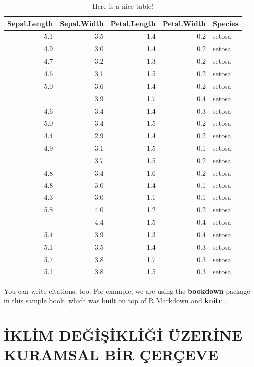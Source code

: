 \documentclass[
]{book}
\begin{document}
\begin{table}

\caption{\label{tab:nice-tab}Here is a nice table!}
\centering
\begin{tabular}[t]{rrrrl}
\toprule
Sepal.Length & Sepal.Width & Petal.Length & Petal.Width & Species\\
\midrule
5.1 & 3.5 & 1.4 & 0.2 & setosa\\
4.9 & 3.0 & 1.4 & 0.2 & setosa\\
4.7 & 3.2 & 1.3 & 0.2 & setosa\\
4.6 & 3.1 & 1.5 & 0.2 & setosa\\
5.0 & 3.6 & 1.4 & 0.2 & setosa\\
\addlinespace
5.4 & 3.9 & 1.7 & 0.4 & setosa\\
4.6 & 3.4 & 1.4 & 0.3 & setosa\\
5.0 & 3.4 & 1.5 & 0.2 & setosa\\
4.4 & 2.9 & 1.4 & 0.2 & setosa\\
4.9 & 3.1 & 1.5 & 0.1 & setosa\\
\addlinespace
5.4 & 3.7 & 1.5 & 0.2 & setosa\\
4.8 & 3.4 & 1.6 & 0.2 & setosa\\
4.8 & 3.0 & 1.4 & 0.1 & setosa\\
4.3 & 3.0 & 1.1 & 0.1 & setosa\\
5.8 & 4.0 & 1.2 & 0.2 & setosa\\
\addlinespace
5.7 & 4.4 & 1.5 & 0.4 & setosa\\
5.4 & 3.9 & 1.3 & 0.4 & setosa\\
5.1 & 3.5 & 1.4 & 0.3 & setosa\\
5.7 & 3.8 & 1.7 & 0.3 & setosa\\
5.1 & 3.8 & 1.5 & 0.3 & setosa\\
\bottomrule
\end{tabular}
\end{table}

You can write citations, too. For example, we are using the \textbf{bookdown} package \citep{R-bookdown} in this sample book, which was built on top of R Markdown and \textbf{knitr} \citep{xie2015}.

\hypertarget{iklim-deux11fiux15fikliux11fi-uxfczerine-kuramsal-bir-uxe7eruxe7eve}{%
\chapter{İKLİM DEĞİŞİKLİĞİ ÜZERİNE KURAMSAL BİR ÇERÇEVE}\label{iklim-deux11fiux15fikliux11fi-uxfczerine-kuramsal-bir-uxe7eruxe7eve}}
\end{document}
